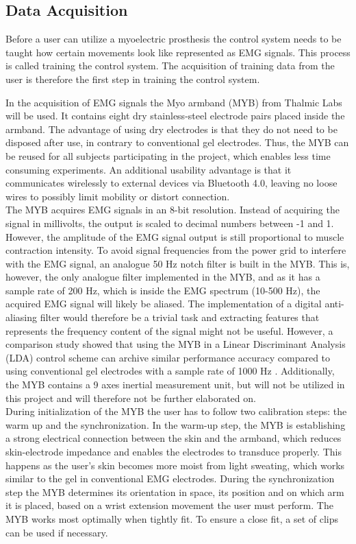 \subsection{Data Acquisition} \label{sec:MYO}
Before a user can utilize a myoelectric prosthesis the control system needs to be taught how certain movements look like represented as EMG signals. This process is called training the control system. The acquisition of training data from the user is therefore the first step in training the control system.

In the acquisition of EMG signals the Myo armband (MYB) from Thalmic Labs will be used. It contains eight dry stainless-steel electrode pairs placed inside the armband. The advantage of using dry electrodes is that they do not need to be disposed after use, in contrary to conventional gel electrodes. Thus, the MYB can be reused for all subjects participating in the project, which enables less time consuming experiments. An additional usability advantage is that it communicates wirelessly to external devices via Bluetooth 4.0, leaving no loose wires to possibly limit mobility or distort connection. \\ 
The MYB acquires EMG signals in an 8-bit resolution. Instead of acquiring the signal in millivolts, the output is scaled to decimal numbers between -1 and 1. However, the amplitude of the EMG signal output is still proportional to muscle contraction intensity. To avoid signal frequencies from the power grid to interfere with the EMG signal, an analogue 50 Hz notch filter is built in the MYB. This is, however, the only analogue filter implemented in the MYB, and as it has a sample rate of 200 Hz, which is inside the EMG spectrum (10-500 Hz), the acquired EMG signal will likely be aliased. The implementation of a digital anti-aliasing filter would therefore be a trivial task and extracting features that represents the frequency content of the signal might not be useful. However, a comparison study showed that using the MYB in a Linear Discriminant Analysis (LDA) control scheme can archive similar performance accuracy compared to using conventional gel electrodes with a sample rate of 1000 Hz \cite{Mendez2017}. Additionally, the MYB contains a 9 axes inertial measurement unit, but will not be utilized in this project and will therefore not be further elaborated on. \\
During initialization of the MYB the user has to follow two calibration steps: the warm up and the synchronization. In the warm-up step, the MYB is establishing a strong electrical connection between the skin and the armband, which reduces skin-electrode impedance and enables the electrodes to transduce properly. This happens as the user's skin becomes more moist from light sweating, which works similar to the gel in conventional EMG electrodes. During the synchronization step the MYB determines its orientation in space, its position and on which arm it is placed, based on a wrist extension movement the user must perform. 
The MYB works most optimally when tightly fit. To ensure a close fit, a set of clips can be used if necessary. 

